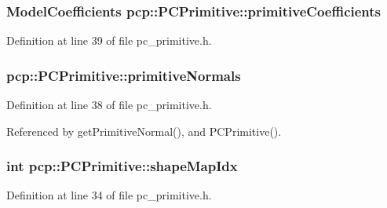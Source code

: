 \hypertarget{classpcp_1_1PCPrimitive_adb0f70b618dddbff203bccd1fa071782}{
\subsubsection[{primitive\-Coefficients}]{\setlength{\rightskip}{0pt plus 5cm}Model\-Coefficients pcp\-::\-P\-C\-Primitive\-::primitive\-Coefficients\hspace{0.3cm}{\ttfamily [private]}}}\label{classpcp_1_1PCPrimitive_adb0f70b618dddbff203bccd1fa071782}


Definition at line 39 of file pc\-\_\-primitive.\-h.

\hypertarget{classpcp_1_1PCPrimitive_a96359fda0d8c70e3b074d97bde90b282}{
\subsubsection[{primitive\-Normals}]{ pcp\-::\-P\-C\-Primitive\-::primitive\-Normals\hspace{0.3cm}{\ttfamily [private]}}}\label{classpcp_1_1PCPrimitive_a96359fda0d8c70e3b074d97bde90b282}


Definition at line 38 of file pc\-\_\-primitive.\-h.



Referenced by get\-Primitive\-Normal(), and P\-C\-Primitive().

\hypertarget{classpcp_1_1PCPrimitive_a809c274d155e9b552cf02a0687b7cc11}{
\subsubsection[{shape\-Map\-Idx}]{\setlength{\rightskip}{0pt plus 5cm}int pcp\-::\-P\-C\-Primitive\-::shape\-Map\-Idx\hspace{0.3cm}{\ttfamily [private]}}}\label{classpcp_1_1PCPrimitive_a809c274d155e9b552cf02a0687b7cc11}


Definition at line 34 of file pc\-\_\-primitive.\-h.



